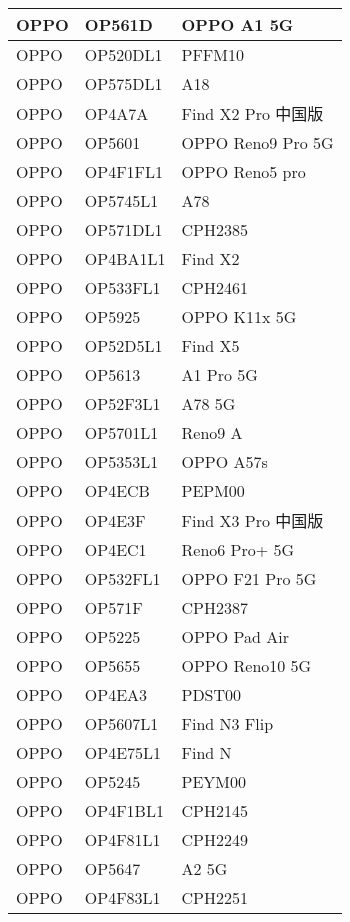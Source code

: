 \begin{tabularx}{\linewidth}{|l|X|X|}
        OPPO & OP561D & OPPO A1 5G \\ \hline
        OPPO & OP520DL1 & PFFM10 \\ \hline
        OPPO & OP575DL1 & A18 \\ \hline
        OPPO & OP4A7A & Find X2 Pro 中国版 \\ \hline
        OPPO & OP5601 & OPPO Reno9 Pro 5G \\ \hline
        OPPO & OP4F1FL1 & OPPO Reno5 pro \\ \hline
        OPPO & OP5745L1 & A78 \\ \hline
        OPPO & OP571DL1 & CPH2385 \\ \hline
        OPPO & OP4BA1L1 & Find X2 \\ \hline
        OPPO & OP533FL1 & CPH2461 \\ \hline
        OPPO & OP5925 & OPPO K11x 5G \\ \hline
        OPPO & OP52D5L1 & Find X5 \\ \hline
        OPPO & OP5613 & A1 Pro 5G \\ \hline
        OPPO & OP52F3L1 & A78 5G \\ \hline
        OPPO & OP5701L1 & Reno9 A \\ \hline
        OPPO & OP5353L1 & OPPO A57s \\ \hline
        OPPO & OP4ECB & PEPM00 \\ \hline
        OPPO & OP4E3F & Find X3 Pro 中国版 \\ \hline
        OPPO & OP4EC1 & Reno6 Pro+ 5G \\ \hline
        OPPO & OP532FL1 & OPPO F21 Pro 5G \\ \hline
        OPPO & OP571F & CPH2387 \\ \hline
        OPPO & OP5225 & OPPO Pad Air \\ \hline
        OPPO & OP5655 & OPPO Reno10 5G \\ \hline
        OPPO & OP4EA3 & PDST00 \\ \hline
        OPPO & OP5607L1 & Find N3 Flip \\ \hline
        OPPO & OP4E75L1 & Find N \\ \hline
        OPPO & OP5245 & PEYM00 \\ \hline
        OPPO & OP4F1BL1 & CPH2145 \\ \hline
        OPPO & OP4F81L1 & CPH2249 \\ \hline
        OPPO & OP5647 & A2 5G \\ \hline
        OPPO & OP4F83L1 & CPH2251 \\ \hline

\end{tabularx}
